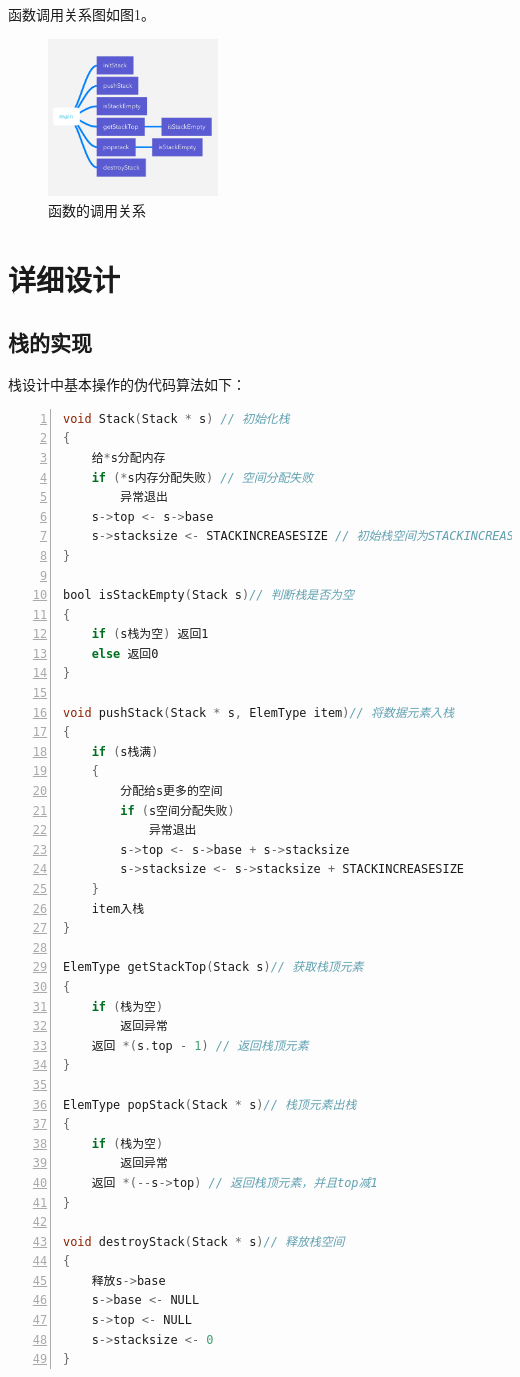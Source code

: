 \documentclass{article}
\begin{document}
函数调用关系图如图1。

\begin{figure}[htbp]
    
    \centering\includegraphics[width=0.4\textwidth]{./Images/pic2_1.png}
    
    \caption{函数的调用关系}
    
\end{figure}

\section{详细设计}

\subsection{栈的实现}

栈设计中基本操作的伪代码算法如下：
\begin{lstlisting}[language={C},
    numbers=left,
    numberstyle=\tiny\consolas,
    basicstyle=\small\consolas]
void Stack(Stack * s) // 初始化栈
{    
    给*s分配内存
    if (*s内存分配失败) // 空间分配失败
        异常退出
    s->top <- s->base
    s->stacksize <- STACKINCREASESIZE // 初始栈空间为STACKINCREASESIZE
}

bool isStackEmpty(Stack s)// 判断栈是否为空
{
    if (s栈为空) 返回1
    else 返回0
}

void pushStack(Stack * s, ElemType item)// 将数据元素入栈
{
    if (s栈满) 
    {
        分配给s更多的空间
        if (s空间分配失败)
            异常退出
        s->top <- s->base + s->stacksize
        s->stacksize <- s->stacksize + STACKINCREASESIZE
    }
    item入栈
}

ElemType getStackTop(Stack s)// 获取栈顶元素
{
    if (栈为空)
        返回异常
    返回 *(s.top - 1) // 返回栈顶元素
}

ElemType popStack(Stack * s)// 栈顶元素出栈
{
    if (栈为空)
        返回异常 
    返回 *(--s->top) // 返回栈顶元素，并且top减1
}

void destroyStack(Stack * s)// 释放栈空间
{
    释放s->base
    s->base <- NULL
    s->top <- NULL
    s->stacksize <- 0
}
\end{lstlisting}
\end{document}
